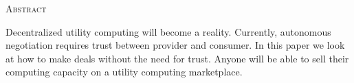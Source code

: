\begin{center}
  \textsc{Abstract}
\end{center}
%
\noindent
%
Decentralized utility computing will become a reality. Currently, autonomous negotiation requires trust between provider and consumer. In this paper we look at how to make deals without the need for trust. Anyone will be able to sell their computing capacity on a utility computing marketplace.


